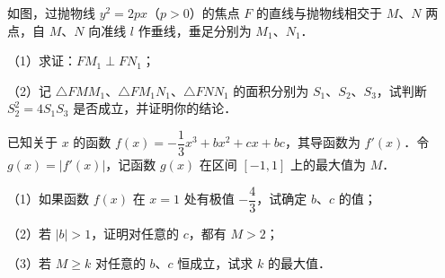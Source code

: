 \begingroup
\renewenvironment{question}{\Needspace{0.5\textheight}}{}
\begin{question}
如图，过抛物线 $y^2=2px$（$p>0$）的焦点 $F$ 的直线与抛物线相交于 $M$、$N$ 两点，自 $M$、$N$ 向准线 $l$ 作垂线，垂足分别为 $M_1$、$N_1$．

（1）求证：$FM_1\perp FN_1$；

（2）记 $\triangle FMM_1$、$\triangle FM_1N_1$、$\triangle FNN_1$ 的面积分别为 $S_1$、$S_2$、$S_3$，试判断 $S_2^2=4S_1S_3$ 是否成立，并证明你的结论．
\nopagebreak[4]
\begin{center}\end{center}
\nopagebreak[4]
\end{question}
\endgroup
\begin{question}
已知关于 $x$ 的函数 $f(x)=-\dfrac13x^3+bx^2+cx+bc$，其导函数为 $f'(x)$．令 $g(x)=|f'(x)|$，记函数 $g(x)$ 在区间 $[-1,1]$ 上的最大值为 $M$．

（1）如果函数 $f(x)$ 在 $x=1$ 处有极值 $-\dfrac43$，试确定 $b$、$c$ 的值；

（2）若 $|b|>1$，证明对任意的 $c$，都有 $M>2$；

（3）若 $M\geqslant k$ 对任意的 $b$、$c$ 恒成立，试求 $k$ 的最大值．

\end{question}